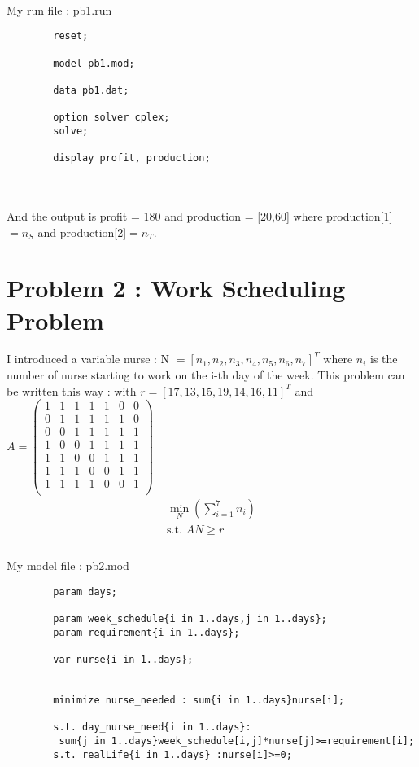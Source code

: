 \documentclass{article}
\newenvironment{DDbox}[1]{
\begin{lrbox}{\BBbox}
    \begin{minipage}{\linewidth}}
{\end{minipage}
\end{lrbox}\noindent\colorbox{Zgris}{\usebox{\BBbox}} \\
[.5cm]}
\begin{document}
\\
My run file : pb1.run
\\
\begin{DDbox}{\linewidth}
    \begin{verbatim}
        reset;

        model pb1.mod;

        data pb1.dat;

        option solver cplex;
        solve;

        display profit, production;
    \end{verbatim}
\end{DDbox}
\\
And the output is profit = 180 and production = [20,60] where production[1]$=n_S$ and production[2]$=n_T$.

\section*{Problem 2 : Work Scheduling Problem}
I introduced a variable nurse : N $ = [n_1,n_2,n_3,n_4,n_5,n_6,n_7]^T$ where $n_i$ is the number of nurse starting to work on the i-th day of the week.
This problem can be written this way : with $r = [17,13,15,19,14,16,11]^T$ and $A = \left(\begin{matrix}
    1&1&1&1&1&0&0\\
    
    0 &1& 1& 1& 1& 1& 0\\
    0 &0 &1 &1 &1 &1 &1\\
    1 &0 &0 &1 &1 &1 &1\\
    1 &1 &0& 0 &1 &1 &1\\
    1 &1 &1 &0 &0 &1 &1\\
    1 &1 &1 &1 &0 &0 &1\\
\end{matrix}\right)$
\begin{equation}
    \begin{array}{c}
        \min_{N}(\sum_{i=1}^7n_i)\\
        \text{s.t. }AN\ge r\\
    \end{array}
\end{equation}
\\
My model file : pb2.mod
\\
\begin{DDbox}{\linewidth}
    \begin{verbatim}
        param days;

        param week_schedule{i in 1..days,j in 1..days};
        param requirement{i in 1..days};

        var nurse{i in 1..days};


        minimize nurse_needed : sum{i in 1..days}nurse[i];

        s.t. day_nurse_need{i in 1..days}:
         sum{j in 1..days}week_schedule[i,j]*nurse[j]>=requirement[i];
        s.t. realLife{i in 1..days} :nurse[i]>=0;
    \end{verbatim}
\end{DDbox}
\end{document}

